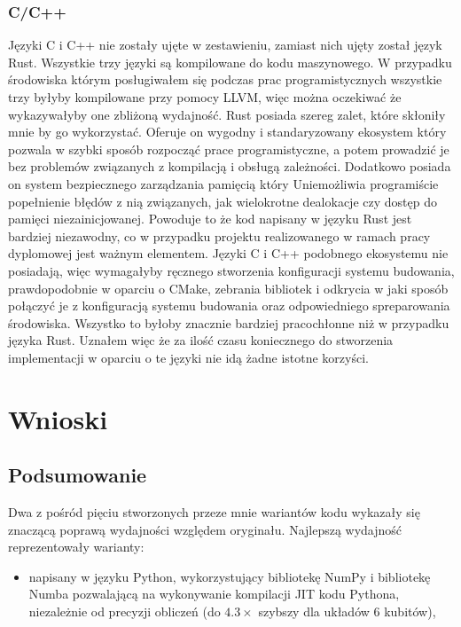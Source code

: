 \documentclass[11pt, a4paper]{article}
\begin{document}
\begin{sloppypar}
    \subsubsection{C/C++}
    Języki C i C++ nie zostały ujęte w zestawieniu, zamiast nich ujęty został język Rust.
    Wszystkie trzy języki są kompilowane do kodu maszynowego. W przypadku środowiska
    którym posługiwałem się podczas prac programistycznych wszystkie trzy byłyby
    kompilowane przy pomocy LLVM, więc można oczekiwać że wykazywałyby one zbliżoną wydajność.
    Rust posiada szereg zalet, które skłoniły mnie by go wykorzystać. Oferuje on wygodny
    i standaryzowany ekosystem który pozwala w szybki sposób rozpocząć prace
    programistyczne, a potem prowadzić je bez problemów związanych z kompilacją i obsługą
    zależności. Dodatkowo posiada on system bezpiecznego zarządzania pamięcią który
    Uniemożliwia programiście popełnienie błędów z nią związanych, jak wielokrotne dealokacje
    czy dostęp do pamięci niezainicjowanej. Powoduje to że kod napisany w języku Rust
    jest bardziej niezawodny, co w przypadku projektu realizowanego w ramach pracy dyplomowej
    jest ważnym elementem. Języki C i C++ podobnego ekosystemu nie posiadają, więc wymagałyby
    ręcznego stworzenia konfiguracji systemu budowania, prawdopodobnie w oparciu o CMake,
    zebrania bibliotek i odkrycia w jaki sposób połączyć je z konfiguracją systemu budowania
    oraz odpowiedniego spreparowania środowiska. Wszystko to byłoby znacznie bardziej
    pracochłonne niż w przypadku języka Rust. Uznałem więc że za ilość czasu koniecznego
    do stworzenia implementacji w oparciu o te języki nie idą żadne istotne korzyści.

    \section{Wnioski}
    \subsection{Podsumowanie}
    Dwa z pośród pięciu stworzonych przeze mnie wariantów kodu wykazały się znaczącą poprawą
    wydajności względem oryginału. Najlepszą wydajność reprezentowały warianty:
    \begin{itemize}
      \item napisany w języku Python, wykorzystujący bibliotekę NumPy i bibliotekę Numba
        pozwalającą na wykonywanie kompilacji JIT kodu Pythona, niezależnie od precyzji obliczeń
        (do $4.3\times$ szybszy dla układów 6 kubitów),


\end{itemize}
\end{sloppypar}
\end{document}
